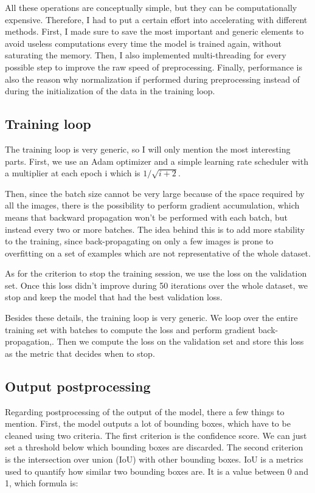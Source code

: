 \documentclass[
]{report}
\begin{document}
All these operations are conceptually simple, but they can be
computationally expensive. Therefore, I had to put a certain effort into
accelerating with different methods. First, I made sure to save the most
important and generic elements to avoid useless computations every time
the model is trained again, without saturating the memory. Then, I also
implemented multi-threading for every possible step to improve the raw
speed of preprocessing. Finally, performance is also the reason why
normalization if performed during preprocessing instead of during the
initialization of the data in the training loop.

\subsection{Training loop}\label{training-loop}

The training loop is very generic, so I will only mention the most
interesting parts. First, we use an Adam optimizer and a simple learning
rate scheduler with a multiplier at each epoch i which is
\(1/\sqrt{i+2}\).

Then, since the batch size cannot be very large because of the space
required by all the images, there is the possibility to perform gradient
accumulation, which means that backward propagation won't be performed
with each batch, but instead every two or more batches. The idea behind
this is to add more stability to the training, since back-propagating on
only a few images is prone to overfitting on a set of examples which are
not representative of the whole dataset.

As for the criterion to stop the training session, we use the loss on
the validation set. Once this loss didn't improve during 50 iterations
over the whole dataset, we stop and keep the model that had the best
validation loss.

Besides these details, the training loop is very generic. We loop over
the entire training set with batches to compute the loss and perform
gradient back-propagation,. Then we compute the loss on the validation
set and store this loss as the metric that decides when to stop.

\subsection{Output postprocessing}\label{output-postprocessing}

Regarding postprocessing of the output of the model, there a few things
to mention. First, the model outputs a lot of bounding boxes, which have
to be cleaned using two criteria. The first criterion is the confidence
score. We can just set a threshold below which bounding boxes are
discarded. The second criterion is the intersection over union (IoU)
with other bounding boxes. IoU is a metrics used to quantify how similar
two bounding boxes are. It is a value between 0 and 1, which formula is:
\end{document}
